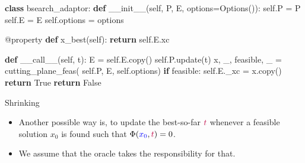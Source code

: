 \documentclass[10pt,ignorenonframetext,serif,onlymath]{beamer}
\newenvironment{Shaded}{}{}
\newcommand{\AttributeTok}[1]{\textcolor[rgb]{0.49,0.56,0.16}{#1}}
\newcommand{\ControlFlowTok}[1]{\textcolor[rgb]{0.00,0.44,0.13}{\textbf{#1}}}
\newcommand{\FunctionTok}[1]{\textcolor[rgb]{0.02,0.16,0.49}{#1}}
\newcommand{\KeywordTok}[1]{\textcolor[rgb]{0.00,0.44,0.13}{\textbf{#1}}}
\newcommand{\NormalTok}[1]{#1}
\newcommand{\OperatorTok}[1]{\textcolor[rgb]{0.40,0.40,0.40}{#1}}
\newcommand{\VariableTok}[1]{\textcolor[rgb]{0.10,0.09,0.49}{#1}}
\providecommand{\tightlist}{%
  \setlength{\itemsep}{0pt}\setlength{\parskip}{0pt}}
\begin{document}
\begin{frame}[fragile]

\begin{Shaded}
\begin{Highlighting}[]
\KeywordTok{class}\NormalTok{ bsearch_adaptor:}
    \KeywordTok{def} \FunctionTok{__init__}\NormalTok{(}\VariableTok{self}\NormalTok{, P, E, options}\OperatorTok{=}\NormalTok{Options()):}
        \VariableTok{self}\NormalTok{.P }\OperatorTok{=}\NormalTok{ P}
        \VariableTok{self}\NormalTok{.E }\OperatorTok{=}\NormalTok{ E}
        \VariableTok{self}\NormalTok{.options }\OperatorTok{=}\NormalTok{ options}

    \AttributeTok{@property}
    \KeywordTok{def}\NormalTok{ x_best(}\VariableTok{self}\NormalTok{):}
        \ControlFlowTok{return} \VariableTok{self}\NormalTok{.E.xc}

    \KeywordTok{def} \FunctionTok{__call__}\NormalTok{(}\VariableTok{self}\NormalTok{, t):}
\NormalTok{        E }\OperatorTok{=} \VariableTok{self}\NormalTok{.E.copy()}
        \VariableTok{self}\NormalTok{.P.update(t)}
\NormalTok{        x, _, feasible, _ }\OperatorTok{=}\NormalTok{ cutting_plane_feas(}
            \VariableTok{self}\NormalTok{.P, E, }\VariableTok{self}\NormalTok{.options)}
        \ControlFlowTok{if}\NormalTok{ feasible:}
            \VariableTok{self}\NormalTok{.E._xc }\OperatorTok{=}\NormalTok{ x.copy()}
            \ControlFlowTok{return} \VariableTok{True}
        \ControlFlowTok{return} \VariableTok{False}
\end{Highlighting}
\end{Shaded}

\end{frame}

\begin{frame}{Shrinking}
\protect\hypertarget{shrinking}{}

\begin{itemize}
\tightlist
\item
  Another possible way is, to update the best-so-far
  \({\color{purple}t}\) whenever a feasible solution \(x_0\) is found
  such that \(\Phi({\color{blue}x_0}, {\color{purple}t}) = 0\).
\item
  We assume that the oracle takes the responsibility for that.
\end{itemize}

\end{frame}
\end{document}
